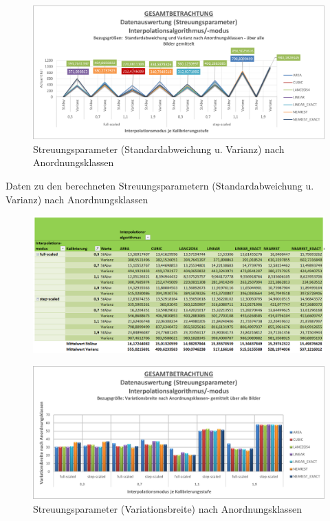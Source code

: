 \documentclass[
fontsize=10pt, 
listof = totoc,
parskip = half	
]{report}
\begin{document}
\begin{figure}[H]
	\centering
	\includegraphics[width=14cm, height=\textheight, keepaspectratio]{pics/DA_Gesamt_Streu1_AKL}
	\caption{Streuungsparameter (Standardabweichung u. Varianz) nach Anordnungsklassen}
	\label{fig:DAGesamtStreu1AKL}
\end{figure}

\begin{table}[H]
	\caption{Daten zu den berechneten Streuungsparametern (Standardabweichung u. Varianz) nach Anordnungsklassen}
	\begin{figure}[H]
		\centering
		\includegraphics[width=\textwidth, height=\textheight, keepaspectratio]{pics/Tab_DA_Gesamt_Streu1_AKL}
		\label{tab:DAGesamtStreu1GAKL}
	\end{figure}
\end{table}

\begin{figure}[H]
	\centering
	\includegraphics[width=14cm, height=\textheight, keepaspectratio]{pics/DA_Gesamt_Streu2_AKL}
	\caption{Streuungsparameter (Variationsbreite) nach Anordnungsklassen}
	\label{fig:DAGesamtStreu2AKL}
\end{figure}
\end{document}
